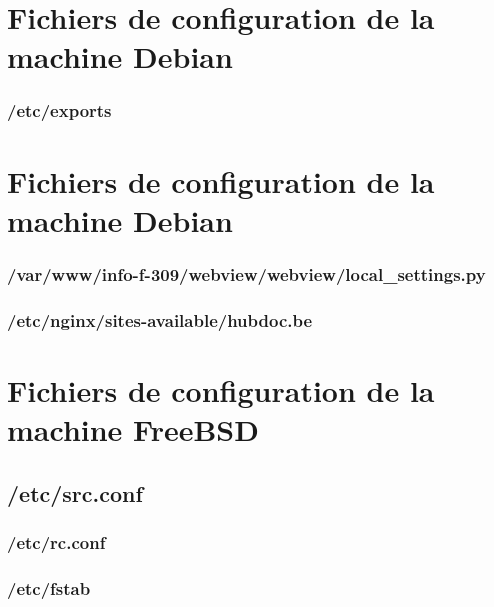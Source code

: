 \documentclass[10pt,a4paper]{article}
\begin{document}
\newpage
\begin{appendices}
  \section{Fichiers de configuration de la machine Debian}
  \subsubsection{/etc/exports}
  \label{subs:etc-exports}
  

  \section{Fichiers de configuration de la machine Debian}
  \subsubsection{/var/www/info-f-309/webview/webview/local\_settings.py}
  \label{subs:deb-webview-local-settings}
  

  \subsubsection{/etc/nginx/sites-available/hubdoc.be}
  \label{subs:deb-nginx-sites-avail-hubdoc}
  

  \section{Fichiers de configuration de la machine FreeBSD}

  \subsection{/etc/src.conf}
  \label{sub:etc-src-conf}
  

  \subsubsection{/etc/rc.conf}
  \label{subs:etc-rc-conf}
  

  \subsubsection{/etc/fstab}
  \label{subs:etc-fstab}
  


\end{appendices}
\end{document}
